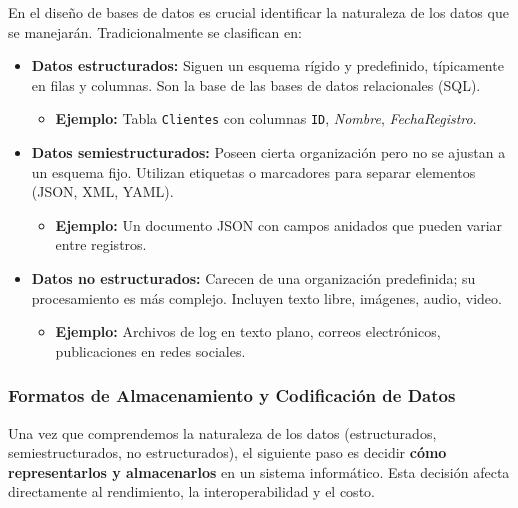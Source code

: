 \documentclass[12pt,a4paper,openany,oneside]{book}
\begin{document}
En el diseño de bases de datos es crucial identificar la naturaleza de los datos que se manejarán. Tradicionalmente se clasifican en:

\begin{itemize}
    \item \textbf{Datos estructurados:} Siguen un esquema rígido y predefinido, típicamente en filas y columnas. Son la base de las bases de datos relacionales (SQL).
        \begin{itemize}
            \item \textbf{Ejemplo:} Tabla \texttt{Clientes} con columnas \texttt{ID}, \textit{Nombre}, \textit{FechaRegistro}.
        \end{itemize}
    \item \textbf{Datos semiestructurados:} Poseen cierta organización pero no se ajustan a un esquema fijo. Utilizan etiquetas o marcadores para separar elementos (JSON, XML, YAML).
        \begin{itemize}
            \item \textbf{Ejemplo:} Un documento JSON con campos anidados que pueden variar entre registros.
        \end{itemize}
    \item \textbf{Datos no estructurados:} Carecen de una organización predefinida; su procesamiento es más complejo. Incluyen texto libre, imágenes, audio, video.
        \begin{itemize}
            \item \textbf{Ejemplo:} Archivos de log en texto plano, correos electrónicos, publicaciones en redes sociales.
        \end{itemize}
\end{itemize}



\subsubsection{Formatos de Almacenamiento y Codificación de Datos}

Una vez que comprendemos la naturaleza de los datos (estructurados, semiestructurados, no estructurados), el siguiente paso es decidir \textbf{cómo representarlos y almacenarlos} en un sistema informático. Esta decisión afecta directamente al rendimiento, la interoperabilidad y el costo.
\end{document}
